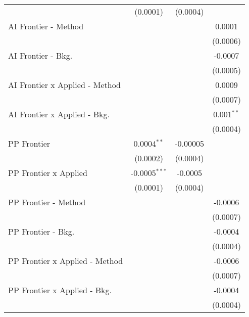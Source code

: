 \begin{tabular}{lccc}
                                  & (0.0001)        & (0.0004)        &   \\   
   AI Frontier - Method           &                 &                 & 0.0001\\   
                                  &                 &                 & (0.0006)\\   
   AI Frontier - Bkg.             &                 &                 & -0.0007\\   
                                  &                 &                 & (0.0005)\\   
   AI Frontier x Applied - Method &                 &                 & 0.0009\\   
                                  &                 &                 & (0.0007)\\   
   AI Frontier x Applied - Bkg.   &                 &                 & 0.001$^{**}$\\   
                                  &                 &                 & (0.0004)\\   
   PP Frontier                    & 0.0004$^{**}$   & -0.00005        &   \\   
                                  & (0.0002)        & (0.0004)        &   \\   
   PP Frontier x Applied          & -0.0005$^{***}$ & -0.0005         &   \\   
                                  & (0.0001)        & (0.0004)        &   \\   
   PP Frontier - Method           &                 &                 & -0.0006\\   
                                  &                 &                 & (0.0007)\\   
   PP Frontier - Bkg.             &                 &                 & -0.0004\\   
                                  &                 &                 & (0.0004)\\   
   PP Frontier x Applied - Method &                 &                 & -0.0006\\   
                                  &                 &                 & (0.0007)\\   
   PP Frontier x Applied - Bkg.   &                 &                 & -0.0004\\   
                                  &                 &                 & (0.0004)\\   

\end{tabular}
